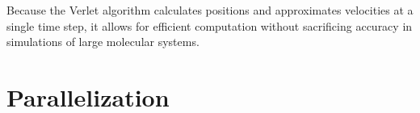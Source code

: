 \documentclass[conference]{IEEEtran}
\begin{document}

Because the Verlet algorithm calculates positions and approximates velocities at a single time step, it allows for 
efficient computation without sacrificing accuracy in simulations of large molecular systems.


 






\section{Parallelization}





\end{document}
